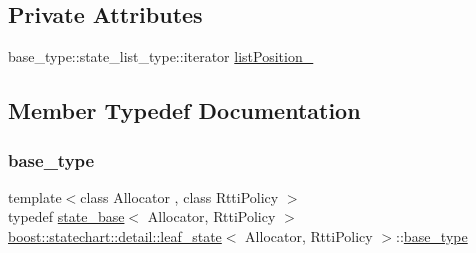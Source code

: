 \subsection*{Private Attributes}
\begin{DoxyCompactItemize}
\item 
base\+\_\+type\+::state\+\_\+list\+\_\+type\+::iterator \mbox{\hyperlink{classboost_1_1statechart_1_1detail_1_1leaf__state_aa6c9ac2a0b6ecd2b87cd70795a8899e1}{list\+Position\+\_\+}}
\end{DoxyCompactItemize}


\subsection{Member Typedef Documentation}
\mbox{\label{classboost_1_1statechart_1_1detail_1_1leaf__state_af4aaeff71edcd85f0416b793157de5a6}} 
\subsubsection{\texorpdfstring{base\+\_\+type}{base\_type}}
{\footnotesize\ttfamily template$<$class Allocator , class Rtti\+Policy $>$ \\
typedef \mbox{\hyperlink{classboost_1_1statechart_1_1detail_1_1state__base}{state\+\_\+base}}$<$ Allocator, Rtti\+Policy $>$ \mbox{\hyperlink{classboost_1_1statechart_1_1detail_1_1leaf__state}{boost\+::statechart\+::detail\+::leaf\+\_\+state}}$<$ Allocator, Rtti\+Policy $>$\+::\mbox{\hyperlink{classboost_1_1statechart_1_1detail_1_1leaf__state_af4aaeff71edcd85f0416b793157de5a6}{base\+\_\+type}}\hspace{0.3cm}{\ttfamily [private]}}

\mbox{\label{classboost_1_1statechart_1_1detail_1_1leaf__state_a50634727a16fd74c39340410b1e8217d}} 
